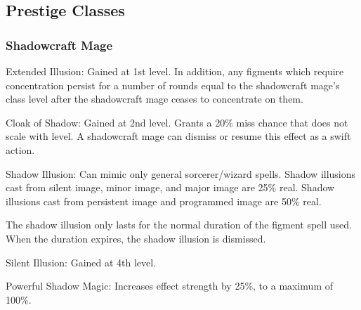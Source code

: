 \subsection{Prestige Classes}
\subsubsection{Shadowcraft Mage}
\begin{itemize*}
\item Extended Illusion: Gained at 1st level. In addition, any figments which require concentration persist for a number of rounds equal to the shadowcraft mage's class level after the shadowcraft mage ceases to concentrate on them.
\item Cloak of Shadow: Gained at 2nd level. Grants a 20\% miss chance that does not scale with level. A shadowcraft mage can dismiss or resume this effect as a swift action.
\item Shadow Illusion: Can mimic only general sorcerer/wizard spells. Shadow illusions cast from silent image, minor image, and major image are 25\% real. Shadow illusions cast from persistent image and programmed image are 50\% real.
\par The shadow illusion only lasts for the normal duration of the figment spell used. When the duration expires, the shadow illusion is dismissed.
\item Silent Illusion: Gained at 4th level.
\item Powerful Shadow Magic: Increases effect strength by 25\%, to a maximum of 100\%.
\end{itemize*}